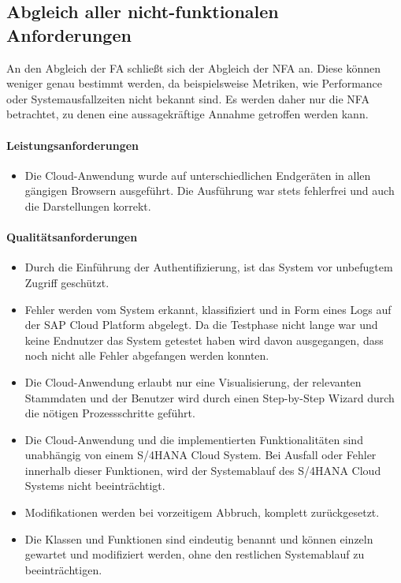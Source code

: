 \subsection{Abgleich aller nicht-funktionalen Anforderungen}
An den Abgleich der \acs{FA} schließt sich der Abgleich der \acs{NFA} an. Diese können weniger genau bestimmt werden, da beispielsweise Metriken, wie Performance oder Systemausfallzeiten nicht bekannt sind. Es werden daher nur die \acs{NFA} betrachtet, zu denen eine aussagekräftige Annahme getroffen werden kann.

\paragraph{Leistungsanforderungen}
\begin{itemize}
    \item Die Cloud-Anwendung wurde auf unterschiedlichen Endgeräten in allen gängigen Browsern ausgeführt. Die Ausführung war stets fehlerfrei und auch die Darstellungen korrekt.
\end{itemize}
\paragraph{Qualitätsanforderungen}
\begin{itemize}
    \item Durch die Einführung der Authentifizierung, ist das System vor unbefugtem Zugriff geschützt.
    \item Fehler werden vom System erkannt, klassifiziert und in Form eines Logs auf der SAP Cloud Platform abgelegt. Da die Testphase nicht lange war und keine Endnutzer das System getestet haben wird davon ausgegangen, dass noch nicht alle Fehler abgefangen werden konnten.
    \item Die Cloud-Anwendung erlaubt nur eine Visualisierung, der relevanten Stammdaten und der Benutzer wird durch einen Step-by-Step Wizard durch die nötigen Prozessschritte geführt.    
    \item Die Cloud-Anwendung und die implementierten Funktionalitäten sind unabhängig von einem S/4HANA Cloud System. Bei Ausfall oder Fehler innerhalb dieser Funktionen, wird der Systemablauf des S/4HANA Cloud Systems nicht beeinträchtigt.
    \item Modifikationen werden bei vorzeitigem Abbruch, komplett zurückgesetzt.
    \item Die Klassen und Funktionen sind eindeutig benannt und können einzeln gewartet und modifiziert werden, ohne den restlichen Systemablauf zu beeinträchtigen.
\end{itemize}
